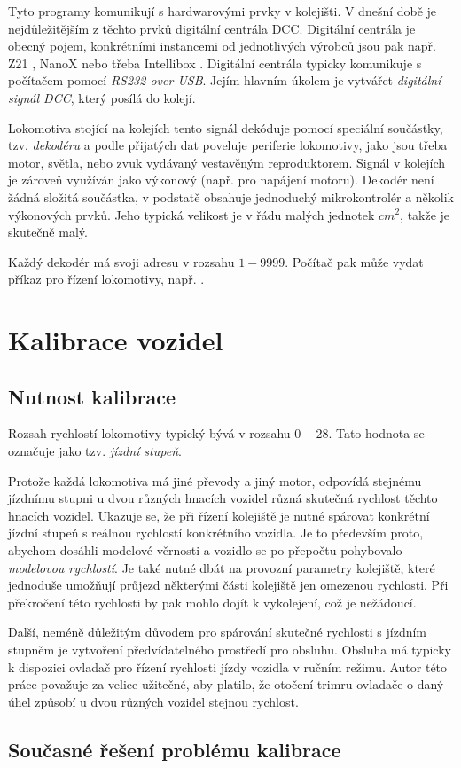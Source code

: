 Tyto programy komunikují s hardwarovými prvky v kolejišti. V dnešní době je
nejdůležitějším z těchto prvků digitální centrála DCC. Digitální centrála je
obecný pojem, konkrétními instancemi od jednotlivých výrobců jsou pak např.
Z21 \cite{}, NanoX \cite{} nebo třeba Intellibox \cite{}. Digitální centrála
typicky komunikuje s počítačem pomocí \textit{RS232 over USB}. Jejím hlavním
úkolem je vytvářet \textit{digitální signál DCC}, který posílá do kolejí.

Lokomotiva stojící na kolejích tento signál dekóduje pomocí speciální součástky,
tzv. \textit{dekodéru} a podle přijatých dat poveluje periferie lokomotivy, jako
jsou třeba motor, světla, nebo zvuk vydávaný vestavěným reproduktorem. Signál
v kolejích je zároveň využíván jako výkonový (např. pro napájení motoru).
Dekodér není žádná složitá součástka, v podstatě obsahuje jednoduchý
mikrokontrolér a několik výkonových prvků. Jeho typická velikost je v řádu
malých jednotek $cm^2$, takže je skutečně malý.

Každý dekodér má svoji adresu v rozsahu $1-9999$. Počítač pak může vydat příkaz
pro řízení lokomotivy, např. \textit{}.

\section{Kalibrace vozidel}

\subsection{Nutnost kalibrace}

Rozsah rychlostí lokomotivy typický bývá v rozsahu $0-28$. Tato hodnota se
označuje jako tzv. \textit{jízdní stupeň}.

Protože každá lokomotiva má jiné převody a jiný motor, odpovídá stejnému
jízdnímu stupni u dvou různých hnacích vozidel různá skutečná rychlost těchto
hnacích vozidel. Ukazuje se, že při řízení kolejiště je nutné spárovat
konkrétní jízdní stupeň s reálnou rychlostí konkrétního vozidla. Je to
především proto, abychom dosáhli modelové věrnosti a vozidlo se po přepočtu
pohybovalo \textit{modelovou rychlostí}. Je také nutné dbát na provozní
parametry kolejiště, které jednoduše umožňují průjezd některými části kolejiště
jen omezenou rychlosti. Při překročení této rychlosti by pak mohlo dojít k
vykolejení, což je nežádoucí.

Další, neméně důležitým důvodem pro spárování skutečné rychlosti s jízdním
stupněm je vytvoření předvídatelného prostředí pro obsluhu. Obsluha má typicky
k dispozici ovladač pro řízení rychlosti jízdy vozidla v ručním režimu. Autor
této práce považuje za velice užitečné, aby platilo, že otočení trimru ovladače
o daný úhel způsobí u dvou různých vozidel stejnou rychlost.

\subsection{Současné řešení problému kalibrace}


